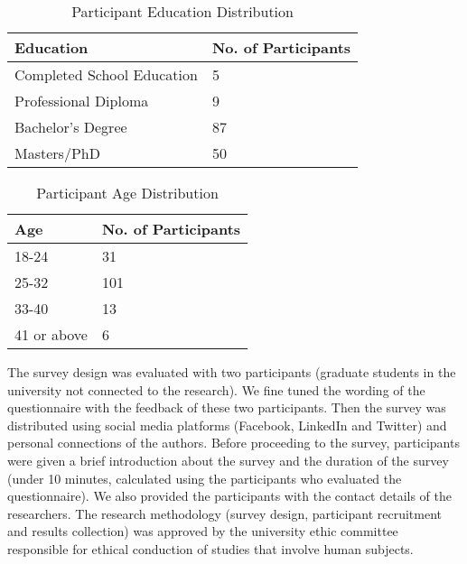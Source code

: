 \documentclass[10pt]{article}
\begin{document}
\begin{center}
\begin{table}[htbp]
\caption{Participant Education Distribution}
\begin{center}

\begin{tabular}{|l|l|} 
\hline
Education & No. of Participants \\
\hline
Completed School Education & 5 \\
\hline
Professional Diploma & 9 \\
\hline
Bachelor's Degree & 87 \\
\hline
Masters/PhD & 50 \\
\hline
\end{tabular}
\end{center}
\end{table}
\end{center} 

\begin{center}
\begin{table}[htbp]
\caption{Participant Age Distribution}
\begin{center}
\begin{tabular}{|l|l|} 
\hline
Age & No. of Participants \\
\hline
18-24  & 31 \\
\hline
25-32 & 101 \\
\hline
33-40& 13 \\
\hline
41 or above & 6\\
\hline
\end{tabular}
\end{center}
\end{table}
\end{center} 

The survey design was evaluated with two participants (graduate students in the university not connected to the research). We fine tuned the wording of the questionnaire with the feedback of these two participants. Then the survey was distributed using social media platforms (Facebook, LinkedIn and Twitter) and personal connections of the authors. Before proceeding to the survey, participants were given a brief introduction about the survey and the duration of the survey (under 10 minutes, calculated using the participants who evaluated the questionnaire). We also provided the participants with the contact details of the researchers. The research methodology (survey design, participant recruitment and results collection) was approved by the university ethic committee responsible for ethical conduction of studies that involve human subjects.
\end{document}
